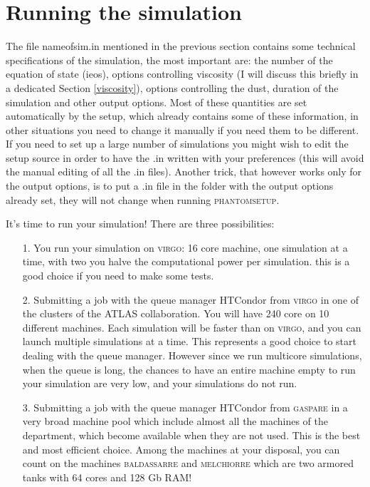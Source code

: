 \documentclass[10pt,a4paper,twoside]{article} %
\begin{document}
\section{Running the simulation}

The file nameofsim.in mentioned in the previous section contains some technical specifications of the simulation, the most important are: the number of the equation of state (ieos), options controlling viscosity (I will discuss this briefly in a dedicated Section \ref{viscosity}), options controlling the dust, duration of the simulation and other output options. Most of these quantities are set automatically by the setup, which already contains some of these information, in other situations you need to change it manually if you need them to be different.
If you need to set up a large number of simulations you might wish to edit the setup source in order to have the .in written with your preferences (this will avoid the manual editing of all the .in files). Another trick, that however works only for the output options, is to put a .in file in the folder with the output options already set, they will not change when running \textsc{phantomsetup}.

It's time to run your simulation! There are three possibilities: 

\begin{itemize}
\item[1.] You run your simulation on \textsc{virgo}: 16 core machine, one simulation at a time, with two you halve the computational power per simulation. this is a good choice if you need to make some tests.

\item[2.] Submitting a job with the queue manager HTCondor from \textsc{virgo} in one of the clusters of the ATLAS collaboration. You will have 240 core on 10 different machines. Each simulation will be faster than on \textsc{virgo}, and you can launch multiple simulations at a time. This represents a good choice to start dealing with the queue manager. However since we run multicore simulations, when the queue is long, the chances to have an entire machine empty to run your simulation are very low, and your simulations do not run.

\item[3.] Submitting a job with the queue manager HTCondor from \textsc{gaspare} in a very broad machine pool which include almost all the machines of the department, which become available when they are not used. This is the best and most efficient choice. Among the machines at your disposal, you can count on the machines \textsc{baldassarre} and \textsc{melchiorre} which are two armored tanks with 64 cores and 128 Gb RAM!
\end{itemize}
\end{document}
